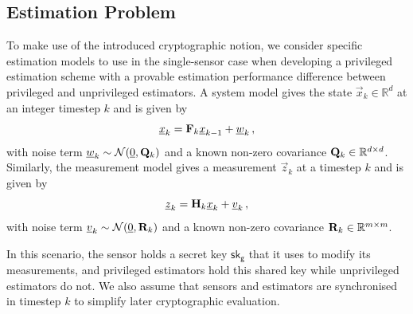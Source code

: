% 
% 

\subsection{Estimation Problem}\label{subsec:priv_estimation:estimation_problem}
To make use of the introduced cryptographic notion, we consider specific estimation models to use in the single-sensor case when developing a privileged estimation scheme with a provable estimation performance difference between privileged and unprivileged estimators. A system model gives the state $\vec{x}_k\in\mathbb{R}^d$ at an integer timestep $k$ and is given by
\begin{equation}\label{eq:priv_estimation:system_model}
    {\underline{x}}_k = {{\mathbf{F}}}_k{\underline{x}}_{k-1} + {\underline{w}}_k\,,
\end{equation}
with noise term ${\underline{w}}_k\sim \mathcal{N}({\underline{0}}, {{\mathbf{Q}}}_k)$ and a known non-zero covariance ${{\mathbf{Q}}}_k\in \mathbb{R}^{d\times d}$. Similarly, the measurement model gives a measurement $\vec{z}_k$ at a timestep $k$ and is given by
\begin{equation}\label{eq:priv_estimation:single_sensor_measurement_model}
    {\underline{z}}_k = {{\mathbf{H}}}_k{\underline{x}}_k + {\underline{v}}_k\,,
\end{equation}
with noise term ${\underline{v}}_k\sim \mathcal{N}({\underline{0}}, {{\mathbf{R}}}_k)$ and a known non-zero covariance ${{\mathbf{R}}}_k\in \mathbb{R}^{m\times m}$.

In this scenario, the sensor holds a secret key $\mathsf{sk}_{\mathsf{g}}$ that it uses to modify its measurements, and privileged estimators hold this shared key while unprivileged estimators do not. We also assume that sensors and estimators are synchronised in timestep $k$ to simplify later cryptographic evaluation.%

% 
% 

